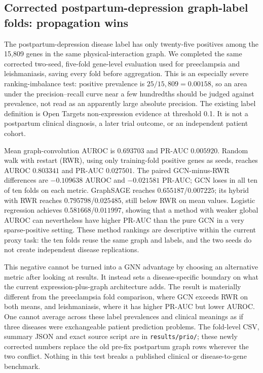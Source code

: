 \documentclass[11pt,a4paper]{article}
\begin{document}
\subsection{Corrected postpartum-depression graph-label folds: propagation wins}
The postpartum-depression disease label has only twenty-five positives among the 15,809 genes in the same physical-interaction graph. We completed the same corrected two-seed, five-fold gene-level evaluation used for preeclampsia and leishmaniasis, saving every fold before aggregation. This is an especially severe ranking-imbalance test: positive prevalence is $25/15{,}809=0.00158$, so an area under the precision--recall curve near a few hundredths should be judged against prevalence, not read as an apparently large absolute precision. The existing label definition is Open Targets non-expression evidence at threshold 0.1. It is not a postpartum clinical diagnosis, a later trial outcome, or an independent patient cohort.

Mean graph-convolution AUROC is $0.693703$ and PR-AUC $0.005920$. Random walk with restart (RWR), using only training-fold positive genes as seeds, reaches AUROC $0.803341$ and PR-AUC $0.027501$. The paired GCN-minus-RWR differences are $-0.109638$ AUROC and $-0.021581$ PR-AUC; GCN loses in all ten of ten folds on each metric. GraphSAGE reaches $0.655187$/$0.007225$; its hybrid with RWR reaches $0.795798$/$0.025485$, still below RWR on mean values. Logistic regression achieves $0.581668$/$0.011997$, showing that a method with weaker global AUROC can nevertheless have higher PR-AUC than the pure GCN in a very sparse-positive setting. These method rankings are descriptive within the current proxy task: the ten folds reuse the same graph and labels, and the two seeds do not create independent disease replications.

This negative cannot be turned into a GNN advantage by choosing an alternative metric after looking at results. It instead sets a disease-specific boundary on what the current expression-plus-graph architecture adds. The result is materially different from the preeclampsia fold comparison, where GCN exceeds RWR on both means, and leishmaniasis, where it has higher PR-AUC but lower AUROC. One cannot average across these label prevalences and clinical meanings as if three diseases were exchangeable patient prediction problems. The fold-level CSV, summary JSON and exact source script are in \texttt{results/prio/}; these newly corrected numbers replace the old pre-fix postpartum graph rows wherever the two conflict. Nothing in this test breaks a published clinical or disease-to-gene benchmark.
\end{document}
